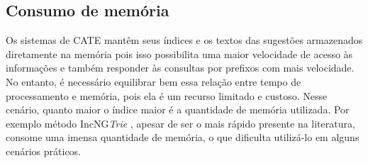 \newpage
\newpage
\subsection{Consumo de memória}
\label{sec:memory_consumption}

Os sistemas de CATE mantêm seus índices e os textos das sugestões armazenados diretamente na memória pois isso possibilita uma maior velocidade de acesso às informações e também responder às consultas por prefixos com mais velocidade. No entanto, é necessário equilibrar bem essa relação entre tempo de processamento e memória, pois ela é um recurso limitado e custoso. Nesse cenário, quanto maior o índice maior é a quantidade de memória utilizada. Por exemplo método IncNG\textit{Trie} \citep{xiao2013efficient}, apesar de ser o mais rápido presente na literatura, consome uma imensa quantidade de memória, o que dificulta utilizá-lo em alguns cenários práticos.

